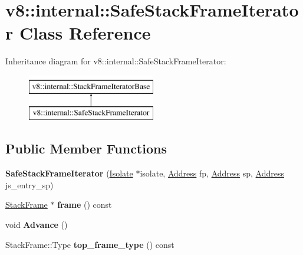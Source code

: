 \hypertarget{classv8_1_1internal_1_1SafeStackFrameIterator}{}\section{v8\+:\+:internal\+:\+:Safe\+Stack\+Frame\+Iterator Class Reference}
\label{classv8_1_1internal_1_1SafeStackFrameIterator}
Inheritance diagram for v8\+:\+:internal\+:\+:Safe\+Stack\+Frame\+Iterator\+:\begin{figure}[H]
\begin{center}
\leavevmode
\includegraphics[height=2.000000cm]{classv8_1_1internal_1_1SafeStackFrameIterator}
\end{center}
\end{figure}
\subsection*{Public Member Functions}
\begin{DoxyCompactItemize}
\item 
\mbox{\label{classv8_1_1internal_1_1SafeStackFrameIterator_afcd82bdd7ccef981aa610d54f65226e0}} 
{\bfseries Safe\+Stack\+Frame\+Iterator} (\mbox{\hyperlink{classv8_1_1internal_1_1Isolate}{Isolate}} $\ast$isolate, \mbox{\hyperlink{classuintptr__t}{Address}} fp, \mbox{\hyperlink{classuintptr__t}{Address}} sp, \mbox{\hyperlink{classuintptr__t}{Address}} js\+\_\+entry\+\_\+sp)
\item 
\mbox{\label{classv8_1_1internal_1_1SafeStackFrameIterator_a885412e8abbb0146a48c951242ae4098}} 
\mbox{\hyperlink{classv8_1_1internal_1_1StackFrame}{Stack\+Frame}} $\ast$ {\bfseries frame} () const
\item 
\mbox{\label{classv8_1_1internal_1_1SafeStackFrameIterator_a277df3982f5c8decd465ca163c06c1f2}} 
void {\bfseries Advance} ()
\item 
\mbox{\label{classv8_1_1internal_1_1SafeStackFrameIterator_adf149d05dc0af2158cb97c5dbb97b2c0}} 
Stack\+Frame\+::\+Type {\bfseries top\+\_\+frame\+\_\+type} () const
\end{DoxyCompactItemize}
